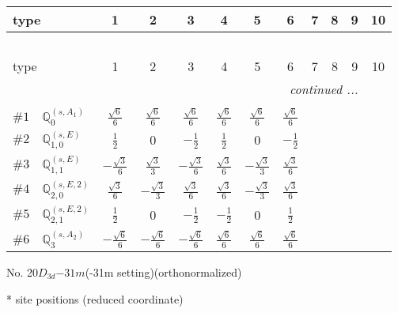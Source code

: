 \documentclass[fleqn,9pt,landscape]{jsarticle}
\begin{document}
\begin{center}
\renewcommand{\arraystretch}{1.3}
\begin{longtable}{lcccccccccc}
 \hline \hline
type & 1 & 2 & 3 & 4 & 5 & 6 & 7 & 8 & 9 & 10 \\ \hline \endfirsthead

\multicolumn{10}{l}{\tablename\ \thetable{}} \\
 \hline \hline
type & 1 & 2 & 3 & 4 & 5 & 6 & 7 & 8 & 9 & 10 \\ \hline \endhead

 \hline \hline
\multicolumn{10}{r}{\footnotesize\it continued ...} \\ \endfoot

 \hline \hline
\multicolumn{10}{r}{} \\ \endlastfoot

$ \#1\quad \mathbb{Q}_{0}^{(s,A_{1})} $ & $ \frac{\sqrt{6}}{6} $ & $ \frac{\sqrt{6}}{6} $ & $ \frac{\sqrt{6}}{6} $ & $ \frac{\sqrt{6}}{6} $ & $ \frac{\sqrt{6}}{6} $ & $ \frac{\sqrt{6}}{6} $ \\ \hline
$ \#2\quad \mathbb{Q}_{1,0}^{(s,E)} $ & $ \frac{1}{2} $ & $ 0 $ & $ - \frac{1}{2} $ & $ \frac{1}{2} $ & $ 0 $ & $ - \frac{1}{2} $ \\ \hline
$ \#3\quad \mathbb{Q}_{1,1}^{(s,E)} $ & $ - \frac{\sqrt{3}}{6} $ & $ \frac{\sqrt{3}}{3} $ & $ - \frac{\sqrt{3}}{6} $ & $ \frac{\sqrt{3}}{6} $ & $ - \frac{\sqrt{3}}{3} $ & $ \frac{\sqrt{3}}{6} $ \\ \hline
$ \#4\quad \mathbb{Q}_{2,0}^{(s,E,2)} $ & $ \frac{\sqrt{3}}{6} $ & $ - \frac{\sqrt{3}}{3} $ & $ \frac{\sqrt{3}}{6} $ & $ \frac{\sqrt{3}}{6} $ & $ - \frac{\sqrt{3}}{3} $ & $ \frac{\sqrt{3}}{6} $ \\ \hline
$ \#5\quad \mathbb{Q}_{2,1}^{(s,E,2)} $ & $ \frac{1}{2} $ & $ 0 $ & $ - \frac{1}{2} $ & $ - \frac{1}{2} $ & $ 0 $ & $ \frac{1}{2} $ \\ \hline
$ \#6\quad \mathbb{Q}_{3}^{(s,A_{2})} $ & $ - \frac{\sqrt{6}}{6} $ & $ - \frac{\sqrt{6}}{6} $ & $ - \frac{\sqrt{6}}{6} $ & $ \frac{\sqrt{6}}{6} $ & $ \frac{\sqrt{6}}{6} $ & $ \frac{\sqrt{6}}{6} $ \\
\end{longtable}
\end{center}
\newpage
\begin{center}
\LARGE
No. 20\quad$D_{3d}$\quad$-31m$\quad(-31m setting)\quad[ trigonal ] (orthonormalized)
\end{center}
\vspace{5mm}
* site positions (reduced coordinate)
\end{document}
